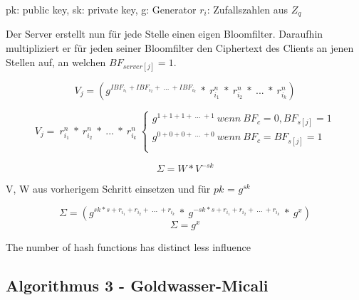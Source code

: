 pk: public key, sk: private key, g: Generator $r_i$: Zufallszahlen aus $Z_q$ 

Der Server erstellt nun für jede Stelle einen eigen Bloomfilter.
Daraufhin multipliziert er für jeden seiner Bloomfilter den Ciphertext des Clients an jenen Stellen auf, an welchen  $BF_{server[j]} = 1$.	

$$ V_{j} = (g^{ IBF_{i_{1}} + IBF_{i_{2}} + \ ...\ +IBF_{i_{k}}} \ * \ r_{i_{1}}^{n} \ * \ r_{i_{2}}^{n} \ * \ ...\ * \  r_{i_{k}}^{n})$$

\[
V_{j} = \ r_{i_{1}}^{n} \ * \ r_{i_{2}}^{n} \ * \ ...\ * \  r_{i_{k}}^{n} \ \left\{
\begin{array}{ll}
g^{1 + 1 + 1 + \ ...\ +1} \ wenn \ BF_{c} = 0,BF_{s[j]} = 1 \\
g^{0 + 0 + 0 + \ ...\ +0} \ wenn \ BF_{c} = BF_{s[j]} = 1\\
\end{array}
\right.
\]




$$\Sigma = W * V^{-sk}$$

V, W aus vorherigem Schritt einsetzen und für $pk$ = $g^{sk}$ 

\vskip 0.1cm 

$$\Sigma = (g^{sk * s + r_{i_{1}} + r_{i_{2}} + \ ...\ +r_{i_{k}}} \ * \ g^{-sk * s + r_{i_{1}} + r_{i_{2}} + \ ...\ +r_{i_{k}}} \ * \ g^x) $$
$$\Sigma = g^x$$




The number of hash functions has distinct less influence 

\subsection{Algorithmus 3 - Goldwasser-Micali}
\label{sec:Sec2.4}






